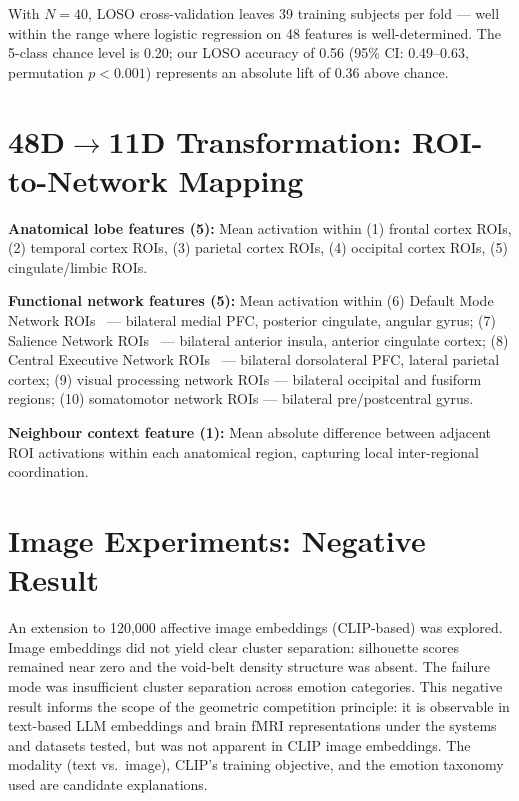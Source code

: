 \documentclass{article}
\begin{document}
With $N\!=\!40$, LOSO cross-validation leaves 39 training subjects per fold ---
well within the range where logistic regression on 48 features is well-determined.
The 5-class chance level is 0.20; our LOSO accuracy of 0.56
(95\% CI: 0.49--0.63, permutation $p<0.001$) represents an absolute lift of 0.36
above chance.

\section{48D$\to$11D Transformation: ROI-to-Network Mapping}
\label{app:11d}

\textbf{Anatomical lobe features (5):} Mean activation within
(1) frontal cortex ROIs,
(2) temporal cortex ROIs,
(3) parietal cortex ROIs,
(4) occipital cortex ROIs,
(5) cingulate/limbic ROIs.

\textbf{Functional network features (5):} Mean activation within
(6) Default Mode Network ROIs~\citep{li2014dmn} --- bilateral medial PFC, posterior
cingulate, angular gyrus;
(7) Salience Network ROIs~\citep{seeley2019} --- bilateral anterior insula, anterior
cingulate cortex;
(8) Central Executive Network ROIs~\citep{miller2001} --- bilateral dorsolateral PFC,
lateral parietal cortex;
(9) visual processing network ROIs --- bilateral occipital and fusiform regions;
(10) somatomotor network ROIs --- bilateral pre/postcentral gyrus.

\textbf{Neighbour context feature (1):} Mean absolute difference between adjacent ROI
activations within each anatomical region, capturing local inter-regional coordination.

\section{Image Experiments: Negative Result}
\label{app:image}

An extension to 120,000 affective image embeddings (CLIP-based) was explored.
Image embeddings did not yield clear cluster separation: silhouette scores remained
near zero and the void-belt density structure was absent.
The failure mode was insufficient cluster separation across emotion categories.
This negative result informs the scope of the geometric competition principle:
it is observable in text-based LLM embeddings and brain fMRI representations under the
systems and datasets tested, but was not apparent in CLIP image embeddings.
The modality (text vs.\ image), CLIP's training objective, and the emotion taxonomy
used are candidate explanations.
\end{document}
